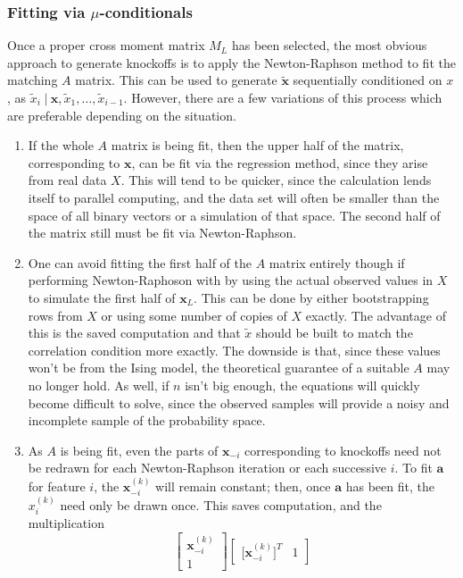 \documentclass[11pt]{article}
\newcommand{\st}{ \; \big | \:}
\theoremstyle{definition}
\begin{document}
\subsubsection{Fitting via $\mu$-conditionals}
        Once a proper cross moment matrix $M_L$ has been selected, the most obvious approach to generate knockoffs is to apply the Newton-Raphson method to fit the matching $A$ matrix. This can be used to generate $\mathbf{ \tilde x}$ sequentially conditioned on $x$, as $\tilde x_i \st \mathbf x,\tilde x_1,\ldots,\tilde x_{i-1}$. However, there are a few variations of this process which are preferable depending on the situation. 
        \begin{enumerate}
            \item If the whole $A$ matrix is being fit, then the upper half of the matrix, corresponding to $\mathbf x$, can be fit via the regression method, since they arise from real data $X$. This will tend to be quicker, since the calculation lends itself to parallel computing, and the data set will often be smaller than the space of all binary vectors or a simulation of that space. The second half of the matrix still must be fit via Newton-Raphson.
            \item One can avoid fitting the first half of the $A$ matrix entirely though if performing Newton-Raphoson with by using the actual observed values in $X$ to simulate the first half of $\mathbf x_L$. This can be done by either bootstrapping rows from $X$ or using some number of copies of $X$ exactly. The advantage of this is the saved computation and that $\tilde x$ should be built to match the correlation condition more exactly. The downside is that, since these values won't be from the Ising model, the theoretical guarantee of a suitable $A$ may no longer hold. As well, if $n$ isn't big enough, the equations will quickly become difficult to solve, since the observed samples will provide a noisy and incomplete sample of the probability space.
            \item As $A$ is being fit, even the parts of $\mathbf x_{-i}$ corresponding to knockoffs need not be redrawn for each Newton-Raphson iteration or each successive $i$. To fit $\mathbf a$ for feature $i$, the $\mathbf x_{-i}^{(k)}$ will remain constant; then, once $\mathbf a$ has been fit, the $x_i^{(k)}$ need only be drawn once. This saves computation, and the multiplication
            \[ \left[\begin{array}{c} \mathbf x_{-i}^{(k)} \\ 1 \end{array}\right]\left[\begin{array}{cc} \mathbf [\mathbf x_{-i}^{(k)}]^T & 1 \end{array}\right] \]

\end{enumerate}
\end{document}
